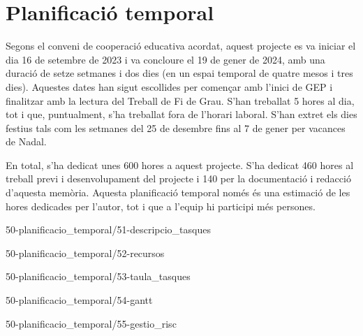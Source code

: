 \chapter{Planificació temporal}

Segons el conveni de cooperació educativa acordat, aquest projecte es va iniciar el dia 16 de setembre de 2023 i va concloure el 19 de gener de 2024, amb una duració de setze setmanes i dos dies (en un espai temporal de quatre mesos i tres dies). Aquestes dates han sigut escollides per començar amb l'inici de GEP i finalitzar amb la lectura del Treball de Fi de Grau. S'han treballat 5 hores al dia, tot i que, puntualment, s'ha treballat fora de l'horari laboral. S'han extret els dies festius tals com les setmanes del 25 de desembre fins al 7 de gener per vacances de Nadal.

En total, s'ha dedicat unes 600 hores a aquest projecte. S'ha dedicat 460 hores al treball previ i desenvolupament del projecte i 140 per la documentació i redacció d'aquesta memòria. Aquesta planificació temporal només és una estimació de les hores dedicades per l'autor, tot i que a l'equip hi participi més persones.

{50-planificacio_temporal/51-descripcio_tasques}

{50-planificacio_temporal/52-recursos}

{50-planificacio_temporal/53-taula_tasques}

{50-planificacio_temporal/54-gantt}

{50-planificacio_temporal/55-gestio_risc}
